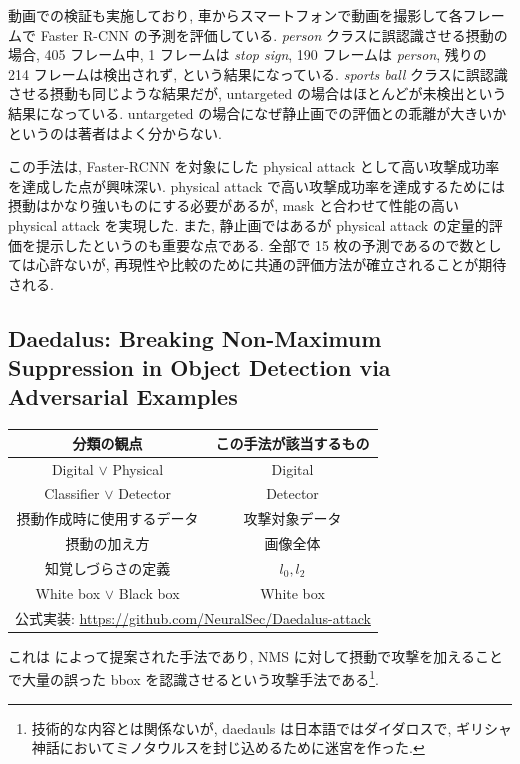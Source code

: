 動画での検証も実施しており, 車からスマートフォンで動画を撮影して各フレームで Faster R-CNN の予測を評価している.
{\it person} クラスに誤認識させる摂動の場合, 405 フレーム中, 1 フレームは {\it stop sign}, 190 フレームは {\it person}, 残りの 214 フレームは検出されず, という結果になっている.
{\it sports ball} クラスに誤認識させる摂動も同じような結果だが, untargeted の場合はほとんどが未検出という結果になっている.
untargeted の場合になぜ静止画での評価との乖離が大きいかというのは著者はよく分からない.

この手法は, Faster-RCNN を対象にした physical attack として高い攻撃成功率を達成した点が興味深い.
physical attack で高い攻撃成功率を達成するためには摂動はかなり強いものにする必要があるが, mask と合わせて性能の高い physical attack を実現した.
また, 静止画ではあるが physical attack の定量的評価を提示したというのも重要な点である.
全部で 15 枚の予測であるので数としては心許ないが, 再現性や比較のために共通の評価方法が確立されることが期待される.



\subsection{Daedalus: Breaking Non-Maximum Suppression in Object Detection via Adversarial Examples}
\label{subsec:daedalus}
%
\begin{table}[htbp]
\begin{center}
\begin{tabular}{|c|c|}
\hline
分類の観点 & この手法が該当するもの \\
\hline
Digital $\lor$ Physical & Digital \\
Classifier $\lor$ Detector & Detector \\
摂動作成時に使用するデータ & 攻撃対象データ \\
摂動の加え方 & 画像全体 \\
知覚しづらさの定義 & $l_0, l_2$ \\
White box $\lor$ Black box & White box \\
\hline
\multicolumn{2}{|c|}{公式実装: \href{https://github.com/NeuralSec/Daedalus-attack}{https://github.com/NeuralSec/Daedalus-attack}} \\
\hline
\end{tabular}
\label{tb:daedalus-summary}
\end{center}
\end{table}
%

これは \cite{wang2019daedalus} によって提案された手法であり, NMS に対して摂動で攻撃を加えることで大量の誤った bbox を認識させるという攻撃手法である\footnote{
技術的な内容とは関係ないが, daedauls は日本語ではダイダロスで, ギリシャ神話においてミノタウルスを封じ込めるために迷宮を作った.
}.

